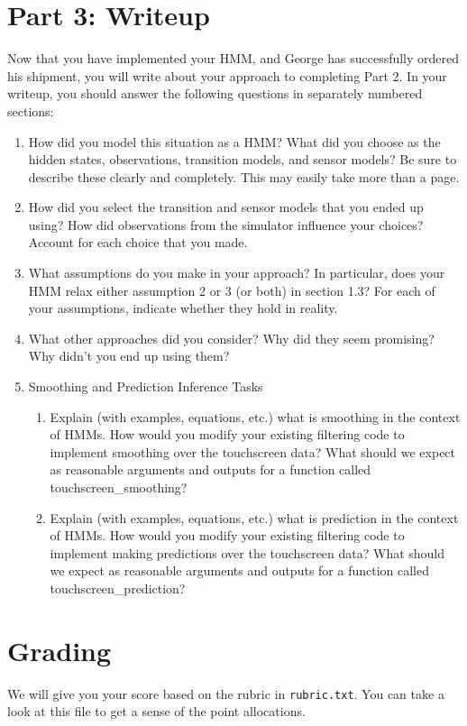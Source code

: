\documentclass{article}
\begin{document}
    \section{Part 3: Writeup}
    Now that you have implemented your HMM, and George has successfully ordered his shipment, you will write about your approach to completing Part 2. In your writeup, you should answer the following questions in separately numbered sections:
    \begin{enumerate}
    \item How did you model this situation as a HMM? What did you choose as the hidden states, observations, transition models, and sensor models? Be sure to describe these clearly and completely. This may easily take more than a page.
    \item How did you select the transition and sensor models that you ended up using? How did observations from the simulator influence your choices? Account for each choice that you made.
    \item What assumptions do you make in your approach? In particular, does your HMM relax either assumption 2 or 3 (or both) in section 1.3? For each of your assumptions, indicate whether they hold in reality.
    \item What other approaches did you consider? Why did they seem promising? Why didn’t you end up using them?
    \item Smoothing and Prediction Inference Tasks
    \begin{enumerate}[label=(\alph*)]
    \item Explain (with examples, equations, etc.) what is smoothing in the context of HMMs. How would you modify your existing filtering code to implement smoothing over the touchscreen data? What should we expect as reasonable arguments and outputs for a function called touchscreen\_smoothing?
     \item Explain (with examples, equations, etc.) what is prediction in the context of HMMs. How would you modify your existing filtering code to implement making predictions over the touchscreen data? What should we expect as reasonable arguments and outputs for a function called touchscreen\_prediction?
    \end{enumerate}
    \end{enumerate}

    \section{Grading}
    We will give you your score based on the rubric in \texttt{rubric.txt}. You can take a look at this file to get a sense of the point allocations.
\end{document}
